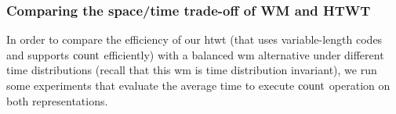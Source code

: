 



	\subsubsection{Comparing the space/time trade-off of WM and HTWT}
	\label{sec:time_exp}
	In order to compare the efficiency of our \gls{htwt} (that uses variable-length codes and supports $\operatorname{count}$ efficiently)
	 with a balanced \gls{wm} alternative under 
	different time distributions (recall that this \gls{wm} is time distribution invariant), 
	we run some experiments that evaluate the average time to execute $\operatorname{count}$ operation on
	both representations.

